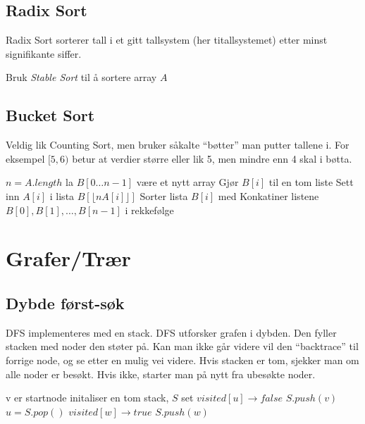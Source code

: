 \documentclass[a4paper, norsk,  10pt]{article}
\begin{document}
{{\subsection{Radix Sort}

Radix Sort sorterer tall i et gitt tallsystem (her titallsystemet) etter minst signifikante siffer. \\

\begin{algorithmic}
	\State Bruk \textit{Stable Sort} til å sortere array $A$
\EndFor
\EndFunction 
\end{algorithmic}

\subsection{Bucket Sort}

Veldig lik Counting Sort, men bruker såkalte ``bøtter'' man putter tallene i. For eksempel $[5, 6)$ betur at verdier større eller lik 5, men mindre enn 4 skal i bøtta. \\

\begin{algorithmic}
\State $n = A.length$
\State la $B[0 \dots n - 1]$ være et nytt array
	\State Gjør $B[i]$ til en tom liste
\EndFor
{}
	\State Sett inn $A[i]$ i lista $B[ \lfloor nA[i] \rfloor ]$
\EndFor
{}
	\State Sorter lista $B[i]$ med  
\EndFor
\State Konkatiner listene $B[0], B[1], \dots , B[n - 1]$ i rekkefølge
\EndFunction 
\end{algorithmic}

\section{Grafer/Trær}

\subsection{Dybde først-søk}

DFS implementeres med en stack. 
DFS utforsker grafen i dybden. Den fyller stacken med noder den støter på. Kan man ikke går videre vil den ``backtrace'' til forrige node, og se etter en mulig vei videre. Hvis stacken er tom, sjekker man om alle noder er besøkt. Hvis ikke, starter man på nytt fra ubesøkte noder. 


\begin{algorithmic}
 \Comment v er startnode
	\State initaliser en tom stack, $S$
	\State set $visited[u] \rightarrow false$
	\EndFor 
	\State $S.push(v)$
		\State $u = S.pop()$
				\State $visited[w] \rightarrow true$
				\State $S.push(w)$
			\EndIf
		\EndFor
	\EndWhile
\EndFunction
\end{algorithmic}

}}
\end{document}
